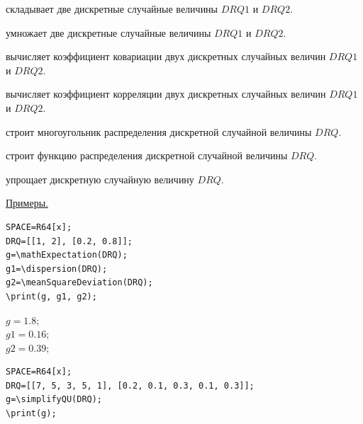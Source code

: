  складывает две дискретные случайные величины $DRQ1$ и $DRQ2$. 

 умножает две дискретные случайные величины $DRQ1$ и $DRQ2$. 

 вычисляет коэффициент ковариации двух дискретных случайных величин $DRQ1$ и $DRQ2$. 

 вычисляет коэффициент корреляции двух дискретных случайных величин $DRQ1$ и $DRQ2$. 

 строит многоугольник распределения дискретной случайной величины $DRQ$. 

 строит функцию распределения дискретной случайной величины $DRQ$. 

 упрощает дискретную случайную величину $DRQ$. 

\underline{Примеры.}

\vspace*{-2mm}
\begin{verbatim}
SPACE=R64[x]; 
DRQ=[[1, 2], [0.2, 0.8]];
g=\mathExpectation(DRQ); 
g1=\dispersion(DRQ); 
g2=\meanSquareDeviation(DRQ);  
\print(g, g1, g2);
\end{verbatim}

{$g = 1. 8; $\\
\hspace*{4mm} $g1 = 0.16; $\\
\hspace*{4mm} $g2 = 0.39;$} 

\begin{verbatim}
SPACE=R64[x]; 
DRQ=[[7, 5, 3, 5, 1], [0.2, 0.1, 0.3, 0.1, 0.3]];
g=\simplifyQU(DRQ); 
\print(g);
\end{verbatim}


